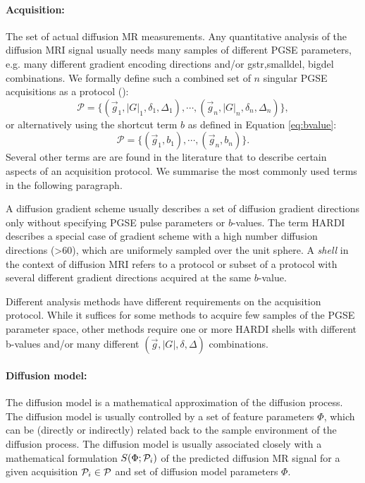 \paragraph{Acquisition:} The set of actual diffusion MR measurements. Any quantitative analysis of the diffusion MRI signal usually needs many samples of different PGSE parameters, e.g. many different gradient encoding directions and/or \gls{gstr},\gls{smalldel}, \gls{bigdel} combinations. We formally define such a combined set of $n$ singular PGSE acquisitions as a protocol (\prot):
\begin{equation}
	\mathcal{P} = \{(\vec{g}_1,|G|_1,\delta_1,\Delta_1),\cdots,(\vec{g}_n,|G|_n,\delta_n,\Delta_n)\},
\end{equation}
or alternatively using the shortcut term $b$ as defined in Equation \ref{eq:bvalue}:
\begin{equation*}		
	\mathcal{P} = \{(\vec{g}_1,b_1),\cdots,(\vec{g}_n,b_n)\}.
\end{equation*}
Several other terms are are found in the literature that to describe certain aspects of an acquisition protocol. We summarise the most commonly used terms in the following paragraph. 


A diffusion gradient scheme usually describes a set of diffusion gradient directions only without specifying PGSE pulse parameters or $b$-values. The term \gls{HARDI} describes a special case of gradient scheme with a high number diffusion directions (>60), which are uniformely sampled over the unit sphere\citep{Tuch:2002,Tournier:2011}. A \textit{shell} in the context of diffusion MRI refers to a protocol or subset of a protocol with several different gradient directions acquired at the same $b$-value. 


Different analysis methods have different requirements on the acquisition protocol. While it suffices for some methods to acquire few samples of the PGSE parameter space, other methods require one or more HARDI shells with different b-values and/or many different $(\vec{g},|G|,\delta,\Delta)$ combinations. 


\paragraph{Diffusion model:} The diffusion model is a mathematical approximation of the diffusion process. The diffusion model is usually controlled by a set of feature parameters $\Phi$, which can be (directly or indirectly) related back to the sample environment of the diffusion process. The diffusion model is usually associated closely with a mathematical formulation $S(\Phi;\mathcal{P}_i)$ of the predicted diffusion MR signal for a given acquisition $\mathcal{P}_i \in \mathcal{P}$ and set of diffusion model parameters $\Phi$.
